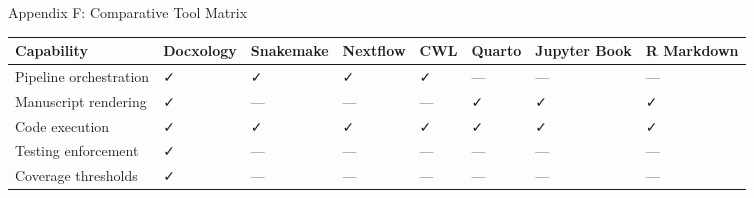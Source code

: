 \documentclass[
  ignorenonframetext,
]{beamer}
\newcounter{none} %
\begin{document}
\begin{frame}{Appendix F: Comparative Tool Matrix}
\protect{}\label{appendix-f-comparative-tool-matrix}
{\def\LTcaptype{none} %
\begin{longtable}[]{@{}
  >{\raggedright\arraybackslash}p{}
  >{\centering\arraybackslash}p{}
  >{\centering\arraybackslash}p{}
  >{\centering\arraybackslash}p{}
  >{\centering\arraybackslash}p{}
  >{\centering\arraybackslash}p{}
  >{\centering\arraybackslash}p{}
  >{\centering\arraybackslash}p{}@{}}
\toprule\noalign{}
\begin{minipage}[b]{\linewidth}\raggedright
Capability
\end{minipage} & \begin{minipage}[b]{\linewidth}\centering
Docxology
\end{minipage} & \begin{minipage}[b]{\linewidth}\centering
Snakemake
\end{minipage} & \begin{minipage}[b]{\linewidth}\centering
Nextflow
\end{minipage} & \begin{minipage}[b]{\linewidth}\centering
CWL
\end{minipage} & \begin{minipage}[b]{\linewidth}\centering
Quarto
\end{minipage} & \begin{minipage}[b]{\linewidth}\centering
Jupyter Book
\end{minipage} & \begin{minipage}[b]{\linewidth}\centering
R Markdown
\end{minipage} \\
\midrule\noalign{}
\endhead
Pipeline orchestration & ✓ & ✓ & ✓ & ✓ & --- & --- & --- \\
Manuscript rendering & ✓ & --- & --- & --- & ✓ & ✓ & ✓ \\
Code execution & ✓ & ✓ & ✓ & ✓ & ✓ & ✓ & ✓ \\
Testing enforcement & ✓ & --- & --- & --- & --- & --- & --- \\
Coverage thresholds & ✓ & --- & --- & --- & --- & --- & --- \\

\end{longtable}}
\end{frame}
\end{document}
